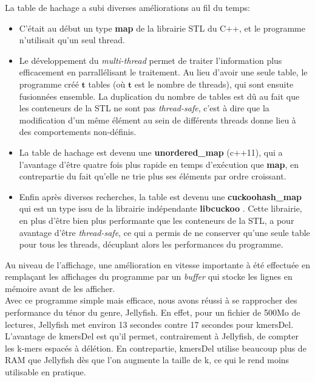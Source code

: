 \documentclass{report}
\begin{document}
      La table de hachage a subi diverses améliorations au fil du temps:\\
      \begin{itemize}
        \item C'était au début un type \textbf{map} de la librairie STL du C++, et le programme n'utilisait qu'un seul thread.\\
        \item Le développement du \textit{multi-thread} permet de traiter l'information plus efficacement en parrallélisant le traitement. Au lieu d'avoir une seule table, le programme créé $\mathbf{t}$ tables (où $\mathbf{t}$ est le nombre de threads), qui sont ensuite fusionnées ensemble. La duplication du nombre de tables est dû au fait que les conteneurs de la STL ne sont pas \textit{thread-safe}, c'est à dire que la modification d'un même élément au sein de différents threads donne lieu à des comportements non-définis.\\
        \item La table de hachage est devenu une \textbf{unordered\_map} (c++11), qui a l'avantage d'être quatre fois plus rapide en temps d'exécution que \textbf{map}, en contrepartie du fait qu'elle ne trie plus ses éléments par ordre croissant.\\
        \item Enfin après diverses recherches, la table est devenu une \textbf{cuckoohash\_map} qui est un type issu de la librairie indépendante \textbf{libcuckoo} \cite{Cuckoo2013} \cite{Cuckoo2014}. Cette librairie, en plus d'être bien plus performante que les conteneurs de la STL, a pour avantage d'être \textit{thread-safe}, ce qui a permis de ne conserver qu'une seule table pour tous les threads, décuplant alors les performances du programme.
      \end{itemize}\bigskip

      Au niveau de l'affichage, une amélioration en vitesse importante à été effectuée en remplaçant les affichages du programme par un \textit{buffer} qui stocke les lignes en mémoire avant de les afficher.\\

      Avec ce programme simple mais efficace, nous avons réussi à se rapprocher des performance du ténor du genre, Jellyfish. En effet, pour un fichier de 500Mo de lectures, Jellyfish met environ 13 secondes contre 17 secondes pour kmersDel. L'avantage de kmersDel est qu'il permet, contrairement à Jellyfish, de compter les k-mers espacés à délétion. En contrepartie, kmersDel utilise beaucoup plus de RAM que Jellyfish dès que l'on augmente la taille de k, ce qui le rend moins utilisable en pratique.
\end{document}
